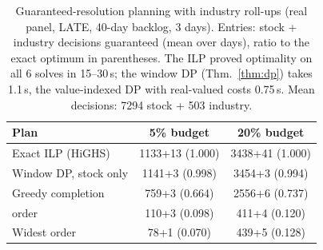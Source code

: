 \begin{table}[t]\centering\caption{Guaranteed-resolution planning with industry roll-ups (real panel, LATE, 40-day backlog, 3 days). Entries: stock + industry decisions guaranteed (mean over days), ratio to the exact optimum in parentheses. The ILP proved optimality on all 6 solves in 15--30\,s; the window DP (Thm.~\ref{thm:dp}) takes 1.1\,s, the value-indexed DP with real-valued costs 0.75\,s. Mean decisions: 7294 stock + 503 industry.}\label{tab:rollup}
\scriptsize\setlength{\tabcolsep}{3pt}\begin{tabular}{lcc}\toprule
Plan & 5\% budget & 20\% budget\\
\midrule
Exact ILP (HiGHS) & 1133+13 (1.000) & 3438+41 (1.000)\\
Window DP, stock only & 1141+3 (0.998) & 3454+3 (0.994)\\
Greedy completion & 759+3 (0.664) & 2556+6 (0.737)\\
\seaq{} order & 110+3 (0.098) & 411+4 (0.120)\\
Widest order & 78+1 (0.070) & 439+5 (0.128)\\
\bottomrule\end{tabular}\end{table}
